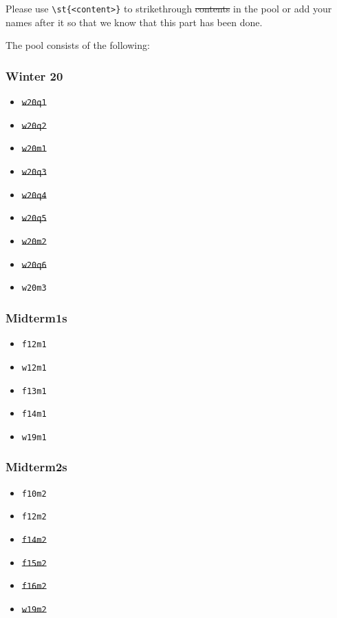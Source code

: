 Please use \lstinline|\st{<content>}| to strikethrough \st{contents} in the pool or add your names after it so that we know that this part has been done.

The pool consists of the following:

\def\width{0.24}
\begin{minipage}[t]{\width\textwidth}
    \subsubsection*{Winter 20}
    \begin{itemize}
        \item \st{\texttt{w20q1}}
        \item \st{\texttt{w20q2}}
        \item \st{\texttt{w20m1}}
        \item \st{\texttt{w20q3}}
        \item \st{\texttt{w20q4}}
        \item \st{\texttt{w20q5}}
        \item \st{\texttt{w20m2}}
        \item \st{\texttt{w20q6}}
        \item \texttt{w20m3}
    \end{itemize}
\end{minipage}
\begin{minipage}[t]{\width\textwidth}
    \subsubsection*{Midterm1s}
    \begin{itemize}
        \item \texttt{f12m1}
        \item \texttt{w12m1}
        \item \texttt{f13m1}
        \item \texttt{f14m1}
        \item \texttt{w19m1}
    \end{itemize}    
\end{minipage}
\begin{minipage}[t]{\width\textwidth}
    \subsubsection*{Midterm2s}
    \begin{itemize}
        \item \texttt{f10m2}
        \item \texttt{f12m2}
        \item \st{\texttt{f14m2}}
        \item \st{\texttt{f15m2}}
        \item \st{\texttt{f16m2}}
        \item \st{\texttt{w19m2}}
    \end{itemize}    
\end{minipage}
